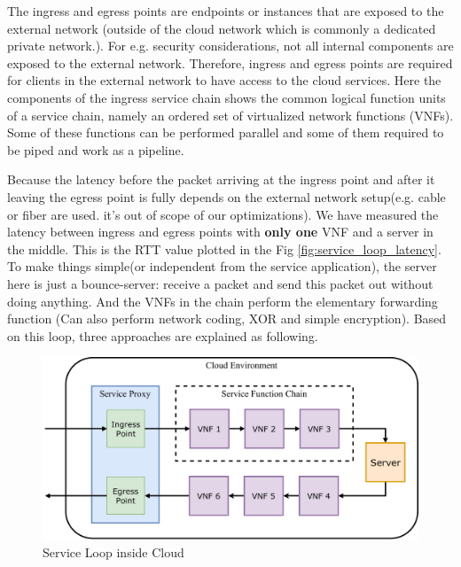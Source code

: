 \documentclass[12pt]{article}
\begin{document}
The ingress and egress points are endpoints or instances that are exposed to the external network (outside of the cloud
network which is commonly a dedicated private network.). For e.g. security considerations, not all internal components
are exposed to the external network. Therefore, ingress and egress points are required for clients in the external
network to have access to the cloud services. Here the components of the ingress service chain shows the common logical
function units of a service chain, namely an ordered set of virtualized network functions (VNFs). Some of these
functions can be performed parallel and some of them required to be piped and work as a pipeline.

Because the latency before the packet arriving at the ingress point and after it leaving the egress point is fully
depends on the external network setup(e.g. cable or fiber are used. it's out of scope of our optimizations). We have
measured the latency between ingress and egress points with \textbf{only one} VNF and a server in the middle. This is the RTT value
plotted in the Fig \ref{fig:service_loop_latency}. To make things simple(or independent from the service application),
the server here is just a bounce-server: receive a packet and send this packet out without doing anything. And the
VNFs in the chain perform the elementary forwarding function (Can also perform network coding, XOR and simple
encryption). Based on this loop, three approaches are explained as following.

\begin{figure}[htpb]
    \centering
    \includegraphics[width=1\linewidth]{./figures/service_path.pdf}
    \caption{Service Loop inside Cloud}
    \label{fig:service_loop}
\end{figure}
\end{document}
